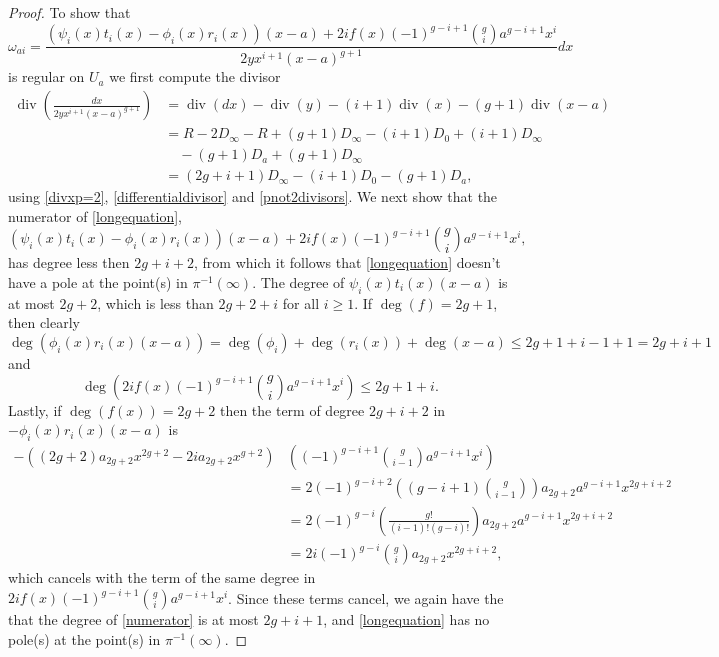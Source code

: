 \documentclass[11pt]{article} %
\theoremstyle{plain}
\theoremstyle{remark}
\DeclareMathOperator{\di}{div}
\begin{document}
\begin{proof}
To show that
\begin{equation}\label{longequation}
\omega_{a i} =  \frac{(\psi_i(x)t_i(x) - \phi_i(x)r_i(x))(x-a) + 2if(x)(-1)^{g-i+1}\binom{g}{i} a^{g-i+1}x^i}{2yx^{i+1}(x-a)^{g+1}}dx
\end{equation}
is regular on $U_a$ we first compute the divisor
\begin{align*}
\di\left( \frac{dx}{2yx^{i+1}(x-a)^{g+1}}\right) & = \di(dx) - \di(y) - (i+1)\di(x) - (g+1)\di(x-a) \\
& = R - 2D_\infty - R + (g+1)D_\infty - (i+1)D_0 + (i+1)D_\infty \\
& \quad - (g+1)D_a + (g+1)D_\infty \\
& = (2g+i+1)D_\infty -(i+1)D_0 - (g+1)D_a,
\end{align*}
using \eqref{divxp=2}, \eqref{differentialdivisor} and \eqref{pnot2divisors}.
We next show that the numerator of \eqref{longequation},
\begin{equation}\label{numerator}
{(\psi_i(x)t_i(x) - \phi_i(x)r_i(x))(x-a) + 2if(x)(-1)^{g-i+1}\binom{g}{i} a^{g-i+1}x^i},
\end{equation}
has degree less then $2g+i+2$, from which it follows that \eqref{longequation} doesn't have a pole at the point(s) in $\pi^{-1}(\infty)$.
The degree of $\psi_i(x)t_i(x)(x-a)$ is at most $2g+2$, which is less than $2g+2+i$ for all $i \geq 1$.
If $\deg(f) = 2g+1$, then clearly
\[
\deg\left( \phi_i(x)r_i(x)(x-a) \right) = \deg(\phi_i) + \deg(r_i(x)) + \deg(x-a) \leq 2g+1 + i-1 +1 = 2g+i+1
\]
and
\[
\deg \left( 2if(x)(-1)^{g-i+1}\binom{g}{i} a^{g-i+1}x^i \right)  \leq  2g+1+i .
\]
Lastly, if $\deg(f(x)) = 2g+2$ then the term of degree $2g+i+2$ in $-\phi_i(x)r_i(x)(x-a)$ is
\begin{align*}
-((2g+2)a_{2g+2}x^{2g+2}-2ia_{2g+2}x^{g+2})&\left( (-1)^{g-i+1}\binom{g}{i-1}a^{g-i+1}x^i\right) \\
&  = 2(-1)^{g-i+2}\left( (g-i+1)\binom{g}{i-1} \right) a_{2g+2}a^{g-i+1}x^{2g+i+2} \\
& = 2(-1)^{g-i} \left( \frac{g!}{(i-1)!(g-i)!} \right) a_{2g+2}a^{g-i+1}x^{2g+i+2} \\
& = 2i(-1)^{g-i}\binom{g}{i}a_{2g+2}x^{2g+i+2},
\end{align*}
which cancels with the term of the same degree in $2if(x)(-1)^{g-i+1}\binom{g}{i}a^{g-i+1}x^i$.
Since these terms cancel, we again have the that the degree of \eqref{numerator} is at most $2g+i+1$, and \eqref{longequation} has no pole(s) at the point(s) in $\pi^{-1}(\infty)$.


\end{proof}
\end{document}
